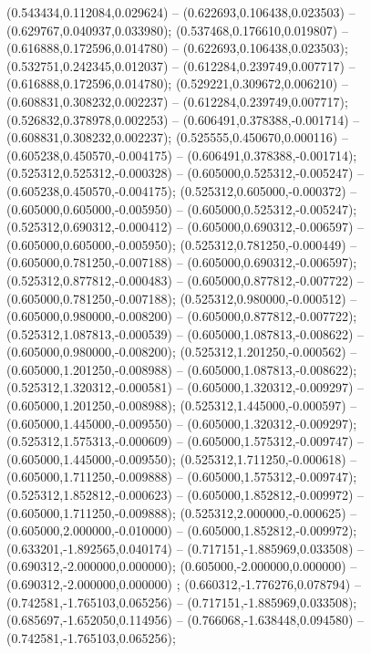  (0.543434,0.112084,0.029624) -- (0.622693,0.106438,0.023503) -- (0.629767,0.040937,0.033980);
 (0.537468,0.176610,0.019807) -- (0.616888,0.172596,0.014780) -- (0.622693,0.106438,0.023503);
 (0.532751,0.242345,0.012037) -- (0.612284,0.239749,0.007717) -- (0.616888,0.172596,0.014780);
 (0.529221,0.309672,0.006210) -- (0.608831,0.308232,0.002237) -- (0.612284,0.239749,0.007717);
 (0.526832,0.378978,0.002253) -- (0.606491,0.378388,-0.001714) -- (0.608831,0.308232,0.002237);
 (0.525555,0.450670,0.000116) -- (0.605238,0.450570,-0.004175) -- (0.606491,0.378388,-0.001714);
 (0.525312,0.525312,-0.000328) -- (0.605000,0.525312,-0.005247) -- (0.605238,0.450570,-0.004175);
 (0.525312,0.605000,-0.000372) -- (0.605000,0.605000,-0.005950) -- (0.605000,0.525312,-0.005247);
 (0.525312,0.690312,-0.000412) -- (0.605000,0.690312,-0.006597) -- (0.605000,0.605000,-0.005950);
 (0.525312,0.781250,-0.000449) -- (0.605000,0.781250,-0.007188) -- (0.605000,0.690312,-0.006597);
 (0.525312,0.877812,-0.000483) -- (0.605000,0.877812,-0.007722) -- (0.605000,0.781250,-0.007188);
 (0.525312,0.980000,-0.000512) -- (0.605000,0.980000,-0.008200) -- (0.605000,0.877812,-0.007722);
 (0.525312,1.087813,-0.000539) -- (0.605000,1.087813,-0.008622) -- (0.605000,0.980000,-0.008200);
 (0.525312,1.201250,-0.000562) -- (0.605000,1.201250,-0.008988) -- (0.605000,1.087813,-0.008622);
 (0.525312,1.320312,-0.000581) -- (0.605000,1.320312,-0.009297) -- (0.605000,1.201250,-0.008988);
 (0.525312,1.445000,-0.000597) -- (0.605000,1.445000,-0.009550) -- (0.605000,1.320312,-0.009297);
 (0.525312,1.575313,-0.000609) -- (0.605000,1.575312,-0.009747) -- (0.605000,1.445000,-0.009550);
 (0.525312,1.711250,-0.000618) -- (0.605000,1.711250,-0.009888) -- (0.605000,1.575312,-0.009747);
 (0.525312,1.852812,-0.000623) -- (0.605000,1.852812,-0.009972) -- (0.605000,1.711250,-0.009888);
 (0.525312,2.000000,-0.000625) -- (0.605000,2.000000,-0.010000) -- (0.605000,1.852812,-0.009972);
 (0.633201,-1.892565,0.040174) -- (0.717151,-1.885969,0.033508) -- (0.690312,-2.000000,0.000000);
 (0.605000,-2.000000,0.000000) -- (0.690312,-2.000000,0.000000) ;
 (0.660312,-1.776276,0.078794) -- (0.742581,-1.765103,0.065256) -- (0.717151,-1.885969,0.033508);
 (0.685697,-1.652050,0.114956) -- (0.766068,-1.638448,0.094580) -- (0.742581,-1.765103,0.065256);
